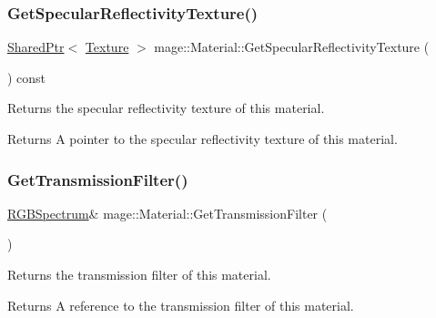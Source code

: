 \subsubsection{\texorpdfstring{Get\+Specular\+Reflectivity\+Texture()}{GetSpecularReflectivityTexture()}}
{\footnotesize\ttfamily \hyperlink{namespacemage_a1e01ae66713838a7a67d30e44c67703e}{Shared\+Ptr}$<$ \hyperlink{classmage_1_1_texture}{Texture} $>$ mage\+::\+Material\+::\+Get\+Specular\+Reflectivity\+Texture (\begin{DoxyParamCaption}{ }\end{DoxyParamCaption}) const\hspace{0.3cm}{\ttfamily [noexcept]}}

Returns the specular reflectivity texture of this material.

\begin{DoxyReturn}{Returns}
A pointer to the specular reflectivity texture of this material. 
\end{DoxyReturn}
\hypertarget{structmage_1_1_material_aba949cb74176530638c7bcb100882196}{}\label{structmage_1_1_material_aba949cb74176530638c7bcb100882196} 
\subsubsection{\texorpdfstring{Get\+Transmission\+Filter()}{GetTransmissionFilter()}\hspace{0.1cm}{\footnotesize\ttfamily [1/2]}}
{\footnotesize\ttfamily \hyperlink{structmage_1_1_r_g_b_spectrum}{R\+G\+B\+Spectrum}\& mage\+::\+Material\+::\+Get\+Transmission\+Filter (\begin{DoxyParamCaption}{ }\end{DoxyParamCaption})\hspace{0.3cm}{\ttfamily [noexcept]}}

Returns the transmission filter of this material.

\begin{DoxyReturn}{Returns}
A reference to the transmission filter of this material. 
\end{DoxyReturn}
\hypertarget{structmage_1_1_material_a38071483e6d47eedb02b2e5c912073e7}{}\label{structmage_1_1_material_a38071483e6d47eedb02b2e5c912073e7} 
